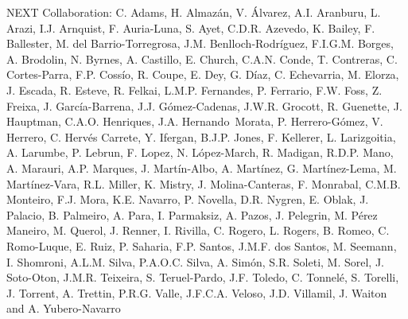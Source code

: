 NEXT Collaboration: C. Adams, H. Almaz\'an, V. \'Alvarez, A.I. Aranburu, L. Arazi, I.J. Arnquist, F. Auria-Luna, S. Ayet, C.D.R. Azevedo, K. Bailey, F. Ballester, M. del Barrio-Torregrosa, J.M. Benlloch-Rodr\'{i}guez, F.I.G.M. Borges, A. Brodolin, N. Byrnes, A. Castillo, E. Church, C.A.N. Conde, T. Contreras, C. Cortes-Parra, F.P. Coss\'io, R. Coupe, E. Dey, G. D\'iaz, C. Echevarria, M. Elorza, J. Escada, R. Esteve, R. Felkai, L.M.P. Fernandes, P. Ferrario, F.W. Foss, Z. Freixa, J. Garc\'ia-Barrena, J.J. G\'omez-Cadenas, J.W.R. Grocott, R. Guenette, J. Hauptman, C.A.O. Henriques, J.A. Hernando~Morata, P. Herrero-G\'omez, V. Herrero, C. Herv\'es Carrete, Y. Ifergan, B.J.P. Jones, F. Kellerer, L. Larizgoitia, A. Larumbe, P. Lebrun, F. Lopez, N. L\'opez-March, R. Madigan, R.D.P. Mano, A. Marauri, A.P. Marques, J. Mart\'in-Albo, A. Mart\'inez, G. Mart\'inez-Lema, M. Mart\'inez-Vara, R.L. Miller, K. Mistry, J. Molina-Canteras, F. Monrabal, C.M.B. Monteiro, F.J. Mora, K.E. Navarro, P. Novella, D.R. Nygren, E. Oblak, J. Palacio, B. Palmeiro, A. Para, I. Parmaksiz, A. Pazos, J. Pelegrin, M. P\'erez Maneiro, M. Querol, J. Renner, I. Rivilla, C. Rogero, L. Rogers, B. Romeo, C. Romo-Luque, E. Ruiz, P. Saharia, F.P. Santos, J.M.F. dos Santos, M. Seemann, I. Shomroni, A.L.M. Silva, P.A.O.C. Silva, A. Sim\'on, S.R. Soleti, M. Sorel, J. Soto-Oton, J.M.R. Teixeira, S. Teruel-Pardo, J.F. Toledo, C. Tonnel\'e, S. Torelli, J. Torrent, A. Trettin, P.R.G. Valle, J.F.C.A. Veloso, J.D. Villamil, J. Waiton and A. Yubero-Navarro